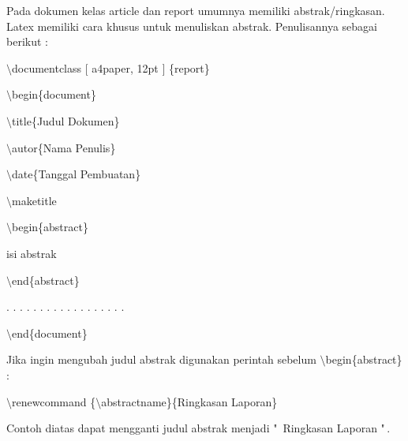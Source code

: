 Pada dokumen kelas article dan report umumnya memiliki 
abstrak/ringkasan. Latex memiliki cara khusus untuk menuliskan abstrak. Penulisannya sebagai berikut :\par \vspace{12pt}

$\setminus$documentclass $[$ a4paper, 12pt $]$ \{report\}\par \vspace{12pt}

$\setminus$begin\{document\}\par \vspace{12pt}

$\setminus$title\{Judul Dokumen\}\par \vspace{12pt}

$\setminus$autor\{Nama Penulis\}\par \vspace{12pt}

$\setminus$date\{Tanggal Pembuatan\}\par \vspace{12pt}

$\setminus$maketitle\par \vspace{12pt}

$\setminus$begin\{abstract\}\par \vspace{12pt}

isi abstrak\par \vspace{12pt}

$\setminus$end\{abstract\}\par \vspace{12pt}

. . . . . . . . . . . . . . . . . .\par \vspace{12pt}

$\setminus$end\{document\}\par \vspace{12pt}

Jika ingin mengubah judul abstrak digunakan perintah sebelum 
$\setminus$begin\{abstract\} :

$\setminus$renewcommand \{$\setminus$abstractname\}\{Ringkasan Laporan\}\par \vspace{12pt}

Contoh diatas dapat mengganti judul abstrak menjadi "\, Ringkasan Laporan "\,.\par \vspace{12pt}


